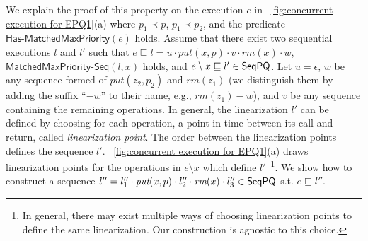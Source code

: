 We explain the proof of this property on the execution $e$ in \figurename~\ref{fig:concurrent execution for EPQ1}(a) where $p_1 \prec p$, $p_1 \prec p_2$, and the predicate $\mathsf{Has\text{-}MatchedMaxPriority}(e)$ holds. Assume that there exist two sequential executions $l$ and $l'$ such that $e \sqsubseteq l=u \cdot \textit{put}(x,p) \cdot v \cdot \textit{rm}(x) \cdot w$, $\mathsf{MatchedMaxPriority\text{-}Seq}(l,x)$ holds, and $e \setminus x \sqsubseteq l' \in \mathsf{SeqPQ}$. Let $u=\epsilon$, $w$ be any sequence formed of $\textit{put}(z_2,p_2)$ and $\textit{rm}(z_1)$ (we distinguish them by adding the suffix ``$-w$'' to their name, e.g., $\textit{rm}(z_1)-w$), and $v$ be any sequence containing the remaining operations. In general, the linearization $l'$ can be defined by choosing for each operation, a point in time between its call and return, called \emph{linearization point}. The order between the linearization points defines the sequence $l'$. \figurename~\ref{fig:concurrent execution for EPQ1}(a) draws linearization points for the operations in $e \setminus x$ which define $l'$~\footnote{In general, there may exist multiple ways of choosing linearization points to define the same linearization. Our construction is agnostic to this choice.}.
We show how to construct a sequence $l''= l''_1 \cdot \textit{put}(x,p) \cdot l''_2 \cdot \textit{rm}(x) \cdot l''_3\in\mathsf{SeqPQ}$ s.t. $e \sqsubseteq l''$.
